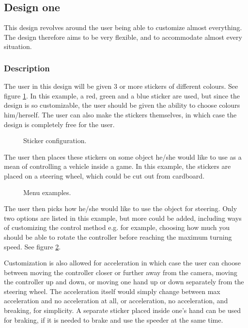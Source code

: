 \subsection{Design one}
This design revolves around the user being able to customize almost everything. The design therefore aims to be very flexible, and to accommodate almost every situation.

\subsubsection*{Description}
The user in this design will be given 3 or more stickers of different colours. See figure \ref{fig:wheel}. In this example, a red, green and a blue sticker are used, but since the design is so customizable, the user should be given the ability to choose colours him/herself. The user can also make the stickers themselves, in which case the design is completely free for the user.


\begin{figure}[h]
\centering
{}
\caption{Sticker configuration.}\label{fig:wheel}
\end{figure}

The user then places these stickers on some object he/she would like to use as a mean of controlling a vehicle inside a game. In this example, the stickers are placed on a steering wheel, which could be cut out from cardboard.

\begin{figure}[h]
\centering
{}
\caption{Menu examples.}\label{fig:select}
\end{figure}

The user then picks how he/she would like to use the object for steering. Only two options are listed in this example, but more could be added, including ways of customizing the control method e.g. for example, choosing how much you should be able to rotate the controller before reaching the maximum turning speed. See figure \ref{fig:select}.

\bigskip

Customization is also allowed for acceleration in which case the user can choose between moving the controller closer or further away from the camera, moving the controller up and down, or moving one hand up or down separately from the steering wheel. 
The acceleration itself would simply change between max acceleration and no acceleration at all, or acceleration, no acceleration, and breaking, for simplicity. A separate sticker placed inside one’s hand can be used for braking, if it is needed to brake and use the speeder at the same time.

